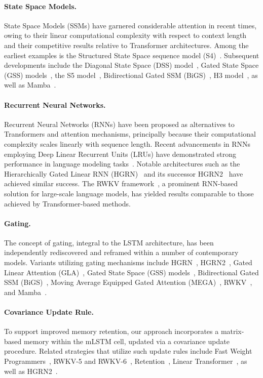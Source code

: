 \paragraph{State Space Models.} State Space Models (SSMs) have garnered considerable attention in recent times, owing to their linear computational complexity with respect to context length and their competitive results relative to Transformer architectures. Among the earliest examples is the Structured State Space sequence model (S4)~\citep{Gu:21}. Subsequent developments include the Diagonal State Space (DSS) model~\citep{Gupta:22}, Gated State Space (GSS) models~\citep{Mehta:22}, the S5 model~\citep{Smith:22}, Bidirectional Gated SSM (BiGS)~\citep{Wang:22}, H3 model~\citep{Fu:23}, as well as Mamba~\citep{Gu:24arxiv}.

\paragraph{Recurrent Neural Networks.} Recurrent Neural Networks (RNNs) have been proposed as alternatives to Transformers and attention mechanisms, principally because their computational complexity scales linearly with sequence length. Recent advancements in RNNs employing Deep Linear Recurrent Units (LRUs) have demonstrated strong performance in language modeling tasks~\citep{Orvieto:23, De:24arxiv}. Notable architectures such as the Hierarchically Gated Linear RNN (HGRN)~\citep{Qin:23} and its successor HGRN2~\citep{Qin:24arxiv} have achieved similar success. The RWKV framework~\citep{Peng:23arxivshort,Peng:24arxivshort}, a prominent RNN-based solution for large-scale language models, has yielded results comparable to those achieved by Transformer-based methods.

\paragraph{Gating.}
The concept of gating, integral to the LSTM architecture, has been independently rediscovered and reframed within a number of contemporary models. Variants utilizing gating mechanisms include HGRN~\citep{Qin:23}, HGRN2~\citep{Qin:24arxiv}, Gated Linear Attention (GLA)~\citep{Yang:23arxiv}, Gated State Space (GSS) models~\citep{Mehta:22}, Bidirectional Gated SSM (BiGS)~\citep{Wang:22}, Moving Average Equipped Gated Attention (MEGA)~\citep{Ma:22}, RWKV~\citep{Peng:23arxivshort}, and Mamba~\citep{Gu:24arxiv}.

\paragraph{Covariance Update Rule.} To support improved memory retention, our approach incorporates a matrix-based memory within the mLSTM cell, updated via a covariance update procedure. Related strategies that utilize such update rules include Fast Weight Programmers~\citep{Schmidhuber:92ncfastweights,Schlag:21}, RWKV-5 and RWKV-6~\citep{Peng:24arxivshort}, Retention~\citep{Sun:23arxiv}, Linear Transformer~\citep{Katharopoulos:20}, as well as HGRN2~\citep{Qin:24arxiv}.

